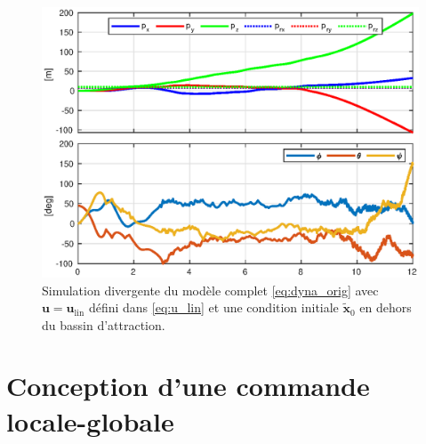 \begin{figure}[ht!]
    \centering
    \includegraphics[trim=0cm 0cm 0cm 0cm,clip,width=0.8\columnwidth]{figures/diverge2.eps}
    \caption{Simulation divergente du modèle complet \eqref{eq:dyna_orig} avec $\boldsymbol{u} = \boldsymbol{u}_{\text{lin}}$ défini dans 
    \eqref{eq:u_lin} et une condition initiale $\tilde{ \boldsymbol{x}}_0$ en dehors du bassin d'attraction.}
    \label{fig_linearize_div}
\end{figure}



\section{Conception d'une commande locale-globale }
\label{sec:ctrl_hyste}
 
